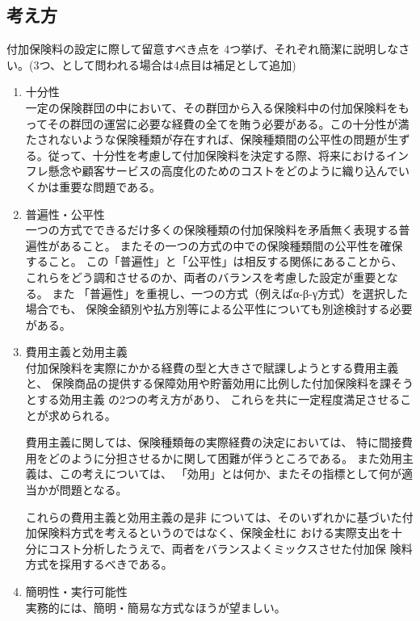 \documentclass[report,gutter=10mm,fore-edge=10mm,uplatex,dvipdfmx]{jlreq}
\begin{document}
\subsection{考え方}


付加保険料の設定に際して留意すべき点を 4つ挙げ、それぞれ簡潔に説明しなさい。(3つ、として問われる場合は4点目は補足として追加)

\begin{enumerate}
\tightlist
\item
  十分性\\
  一定の保険群団の中において、その群団から入る保険料中の付加保険料をもってその群団の運営に必要な経費の全てを賄う必要がある。この十分性が満たされないような保険種類が存在すれば、保険種類間の公平性の問題が生ずる。従って、十分性を考慮して付加保険料を決定する際、将来におけるインフレ懸念や顧客サービスの高度化のためのコストをどのように織り込んでいくかは重要な問題である。
\item
  普遍性・公平性\\

    一つの方式でできるだけ多くの保険種類の付加保険料を矛盾無く表現する普遍性があること。
   またその一つの方式の中での保険種類間の公平性を確保すること。
   この「普遍性」と「公平性」は相反する関係にあることから、
   これらをどう調和させるのか、両者のバランスを考慮した設定が重要となる。
   また 「普遍性」を重視し、一つの方式（例えばα-β-γ方式）を選択した場合でも、
        保険金額別や払方別等による公平性についても別途検討する必要がある。

\item
  費用主義と効用主義\\

    付加保険料を実際にかかる経費の型と大きさで賦課しようとする費用主義と、
    保険商品の提供する保障効用や貯蓄効用に比例した付加保険料を課そうとする効用主義
     の2つの考え方があり、
     これらを共に一定程度満足させることが求められる。

     費用主義に関しては、保険種類毎の実際経費の決定においては、
      特に間接費用をどのように分担させるかに関して困難が伴うところである。
     また効用主義は、この考えについては、
     「効用」とは何か、またその指標として何が適当かが問題となる。

これらの費用主義と効用主義の是非
については、そのいずれかに基づいた付加保険料方式を考えるというのではなく、保険金杜に
おける実際支出を十分にコスト分析したうえで、両者をバランスよくミックスさせた付加保
険料方式を採用するべきである。

\item
  簡明性・実行可能性\\

     実務的には、簡明・簡易な方式なほうが望ましい。

\end{enumerate}
\end{document}
